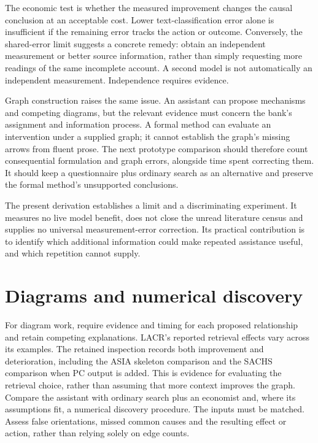 The economic test is whether the measured improvement changes the causal
conclusion at an acceptable cost. Lower text-classification error alone is
insufficient if the remaining error tracks the action or outcome. Conversely,
the shared-error limit suggests a concrete remedy: obtain an independent
measurement or better source information, rather than simply requesting more
readings of the same incomplete account. A second model is not automatically
an independent measurement. Independence requires evidence.

Graph construction raises the same issue. An assistant can propose
mechanisms and competing diagrams, but the relevant evidence must concern
the bank's assignment and information process. A formal method can evaluate
an intervention under a supplied graph; it cannot establish the graph's
missing arrows from fluent prose. The next prototype comparison should
therefore count consequential formulation and graph errors, alongside time
spent correcting them. It should keep a questionnaire plus ordinary search
as an alternative and preserve the formal method's unsupported conclusions.

The present derivation establishes a limit and a discriminating experiment.
It measures no live model benefit, does not close the unread literature
census and supplies no universal measurement-error correction. Its practical
contribution is to identify which additional information could make repeated
assistance useful, and which repetition cannot supply.




\section{Diagrams and numerical discovery}
For diagram work, require evidence and timing for each proposed relationship
and retain competing explanations. LACR's reported retrieval effects vary
across its examples. The retained inspection records both improvement and
deterioration, including the ASIA skeleton comparison and the SACHS
comparison when PC output is added. This is evidence for evaluating the
retrieval choice, rather than assuming that more context improves the graph.
\citep{v12_la_2402_15301}
Compare the assistant with ordinary search plus an economist and, where
its assumptions fit, a numerical discovery procedure. The inputs must
be matched. Assess false orientations, missed common causes and the
resulting effect or action, rather than relying solely on edge counts.

